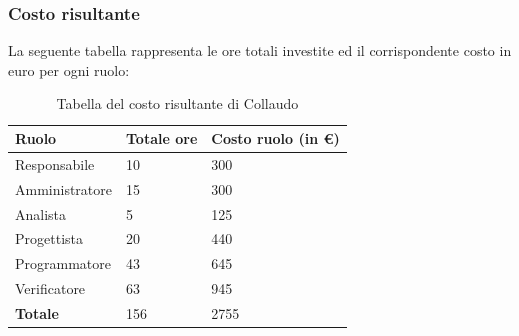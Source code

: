 




\subsubsection{Costo risultante}
La seguente tabella rappresenta le ore totali investite ed il corrispondente costo in euro per ogni ruolo:
{
\renewcommand{\arraystretch}{2}
\begin{longtable}{ C{3cm} C{2cm} C{4cm}}
\caption{Tabella del costo risultante di Collaudo}\\
\rowcolor{\primaryColor}

\textcolor{\secondaryColor}{\textbf{Ruolo}} & 
\textcolor{\secondaryColor}{\textbf{Totale ore}} & 
\textcolor{\secondaryColor}{\textbf{Costo ruolo (in \euro{})}}\\	
\endhead
        
Responsabile    &  10 & 300 \\
Amministratore  &  15 & 300 \\
Analista        &  5 & 125 \\
Progettista     &  20 & 440 \\
Programmatore   &  43 & 645 \\
Verificatore    &  63 & 945 \\
\textbf{Totale} & 156 & 2755 \\
	
\end{longtable}
}


